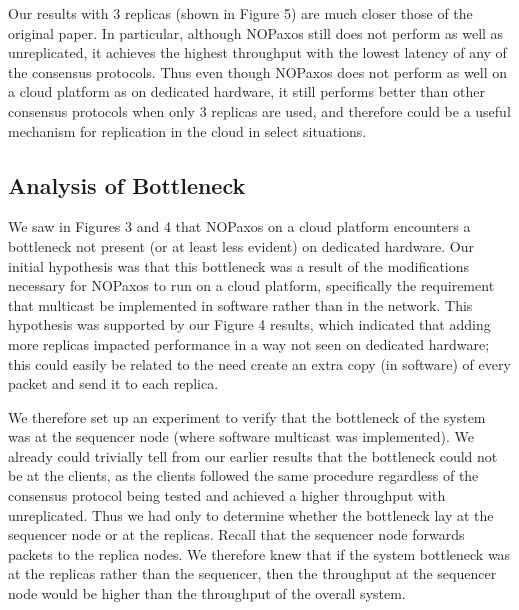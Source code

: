 Our results with 3 replicas (shown in Figure 5) are much closer those of the original paper. In particular, although NOPaxos still does not perform as well as unreplicated, it achieves the highest throughput with the lowest latency of any of the consensus protocols. Thus even though NOPaxos does not perform as well on a cloud platform as on dedicated hardware, it still performs better than other consensus protocols when only 3 replicas are used, and therefore could be a useful mechanism for replication in the cloud in select situations. 

\subsection{Analysis of Bottleneck} \label{bottleneck}

We saw in Figures 3 and 4 that NOPaxos on a cloud platform encounters a bottleneck not present (or at least less evident) on dedicated hardware. Our initial hypothesis was that this bottleneck was a result of the modifications necessary for NOPaxos to run on a cloud platform, specifically the requirement that multicast be implemented in software rather than in the network. This hypothesis was supported by our Figure 4 results, which indicated that adding more replicas impacted performance in a way not seen on dedicated hardware; this could easily be related to the need create an extra copy (in software) of every packet and send it to each replica. 

We therefore set up an experiment to verify that the bottleneck of the system was at the sequencer node (where software multicast was implemented). We already could trivially tell from our earlier results that the bottleneck could not be at the clients, as the clients followed the same procedure regardless of the consensus protocol being tested and achieved a higher throughput with unreplicated. Thus we had only to determine whether the bottleneck lay at the sequencer node or at the replicas. Recall that the sequencer node forwards packets to the replica nodes. We therefore knew that if the system bottleneck was at the replicas rather than the sequencer, then the throughput at the sequencer node would be higher than the throughput of the overall system. 

